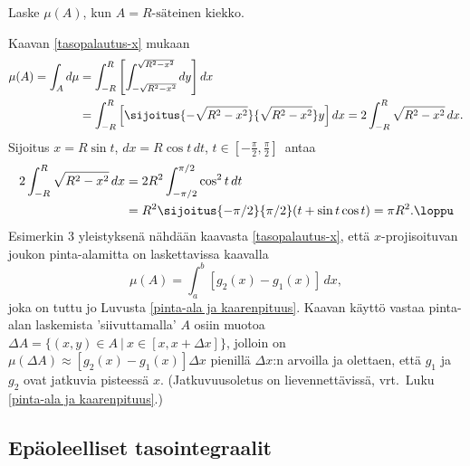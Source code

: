 \begin{Exa} Laske $\mu(A)$, kun $A=\text{$R$-säteinen kiekko}$.
\end{Exa}
\ratk Kaavan \eqref{tasopalautus-x} mukaan
\begin{align*}
\mu(A) = \int_A d\mu 
      &= \int_{-R}^R \left[\int_{-\sqrt{R^2-x^2}}^{\sqrt{R^2-x^2}} dy\right] dx \\
      &= \int_{-R}^R \left[\sijoitus{-\sqrt{R^2-x^2}}{\sqrt{R^2-x^2}} y \right] dx
       = 2\int_{-R}^R \sqrt{R^2-x^2}\,dx.
\end{align*}
Sijoitus $x=R\sin t$, $dx=R\cos t\, dt$, $t\in [-\frac{\pi}{2},\frac{\pi}{2}]\,$ antaa 
\begin{align*}
2\int_{-R}^R \sqrt{R^2-x^2}\,dx &= 2R^2\int_{-\pi/2}^{\pi/2}\cos^2 t\,dt \\
                               &= R^2\sijoitus{-\pi/2}{\pi/2}(t+\sin t\cos t) 
                               = \pi R^2. \loppu
\end{align*}
Esimerkin 3 yleistyksenä nähdään kaavasta \eqref{tasopalautus-x}, että $x$-projisoituvan joukon
pinta-alamitta on laskettavissa kaavalla
\[
\mu(A)=\int_a^b [g_2(x)-g_1(x)]\,dx,
\]
joka on tuttu jo Luvusta \ref{pinta-ala ja kaarenpituus}. Kaavan käyttö vastaa pinta-alan
laskemista 'siivuttamalla' $A$ osiin muotoa 
$\Delta A=\{(x,y)\in A \ | \ x\in [x,x+\Delta x]\}$, jolloin on
$\mu(\Delta A) \approx [g_2(x)-g_1(x)]\Delta x$ pienillä $\Delta x$:n arvoilla ja olettaen,
että $g_1$ ja $g_2$ ovat jatkuvia pisteessä $x$. (Jatkuvuusoletus on lievennettävissä, vrt.\
Luku \ref{pinta-ala ja kaarenpituus}.)

\begin{figure}[H]
\begin{center}

\end{center}
\end{figure}

\subsection*{Epäoleelliset tasointegraalit}

